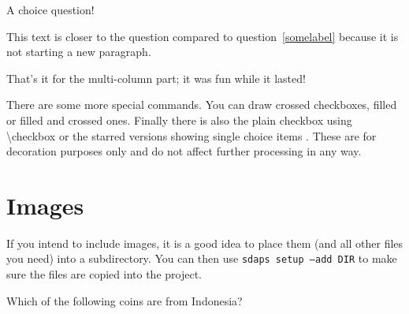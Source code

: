 \documentclass[
  english,
  ]{sdapsclassic}
\begin{document}
\begin{questionnaire}
\begin{Form}
\begin{multicols}{2}
      \begin{choicequestion}[cols=1]{A choice question!}
      \end{choicequestion}

      This text is closer to the question compared to question~\ref{somelabel}
      because it is not starting a new paragraph.


    \end{multicols}

    That's it for the multi-column part; it was fun while it lasted!

    There are some more special commands. You can draw \checkedbox{} crossed
    checkboxes, \filledbox{} filled or \correctedbox{} filled and crossed ones. Finally there is
    also the plain \checkbox{} checkbox using {\ttfamily \textbackslash{}checkbox}
    or the starred versions showing single choice items \checkbox*{}
    \checkedbox*{}. These are for decoration purposes only and do not affect
    further processing in any way.


    \section{Images}

    If you intend to include images, it is a good idea to place them (and all other
    files you need) into a subdirectory. You can then use \texttt{sdaps setup --add DIR}
    to make sure the files are copied into the project.

    \begin{choicequestion}[cols=5]{Which of the following coins are from Indonesia?}
    \end{choicequestion}


\end{Form}
\end{questionnaire}
\end{document}

